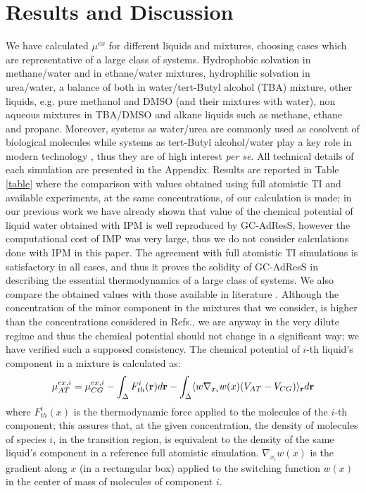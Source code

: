 \documentclass[a4paper,preprint,unsortedaddress]{revtex4-1}
\begin{document}
\section*{Results and Discussion}
We have calculated $\mu^{ex}$ for different liquids and mixtures, choosing cases which are representative of a large class of systems. Hydrophobic solvation in methane/water and in ethane/water mixtures, hydrophilic solvation in urea/water, a balance of both in water/tert-Butyl alcohol (TBA) mixture, other liquids, e.g. pure methanol and DMSO (and their mixtures with water), non aqueous mixtures in TBA/DMSO and alkane liquids such as methane, ethane and propane. Moreover, systems as water/urea are commonly used as cosolvent of biological molecules \cite{nico-debashish} while systems as tert-Butyl alcohol/water play a key role in modern technology \cite{irata}, thus they are of high interest {\it per se}. All technical details of each simulation are presented in the Appendix.
Results are reported in Table \ref{table} where the comparison with values obtained using full atomistic TI and available experiments, at the same concentrations, of our calculation is made; in our previous work we have already shown that value of the chemical potential of liquid water obtained with IPM is well reproduced by GC-AdResS, however the computational cost of IMP was very large, thus we do not consider calculations done with IPM in this paper. 
The agreement with full atomistic TI simulations is satisfactory in all cases, and thus it proves the solidity of GC-AdResS in describing the essential thermodynamics of a large class of systems.
We also compare the obtained values with those available in literature \cite{vang,nico}. Although the concentration of the minor component in the mixtures that we consider, is higher than the concentrations considered in Refs.\cite{vang,nico}, we are anyway in the very dilute regime and thus the chemical potential should not change in a significant way; we have verified  such a supposed consistency. 
The chemical potential of $i$-th liquid's component in a mixture is calculated as:
\begin{equation}
\mu^{ex,i}_{AT}=\mu^{ex,i}_{CG}-\int_{\Delta}{F}^{i}_{th}({\bf r})d{\bf r}-\int_{\Delta}\langle w\nabla_{x_{i}} w(x)(V_{AT}-V_{CG})\rangle_{\bf r}d{\bf r}
\label{icomp}
\end{equation}
where ${F}^{i}_{th}(x)$ is the thermodynamic force applied to the molecules of the $i$-th component; this assures that, at the given concentration, the density of molecules of species $i$, in the transition region, is equivalent to the density of the same liquid's component in a reference full atomistic simulation. $\nabla_{x_{i}} w(x)$ is the gradient along $x$ (in a rectangular box) applied to the switching function $w(x)$ in the center of mass of molecules of component $i$. 
\end{document}
